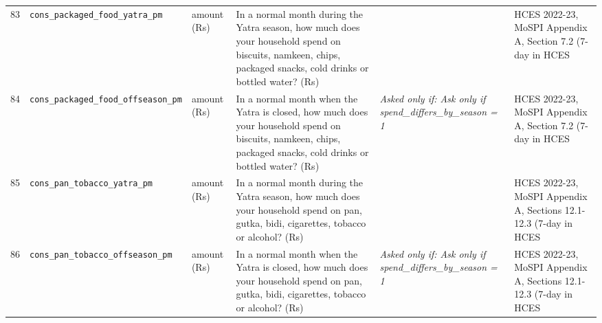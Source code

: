 \documentclass[9pt,a4paper,landscape]{article}
\begin{document}
\begin{longtable}{@{}p{0.5cm}p{3.3cm}p{1.7cm}p{7.3cm}p{5.6cm}p{5.4cm}@{}}
\footnotesize 83 & \footnotesize\texttt{cons\_packaged\_food\_yatra\_pm} & \scriptsize amount (Rs) & \footnotesize In a normal month during the Yatra season, how much does your household spend on biscuits, namkeen, chips, packaged snacks, cold drinks or bottled water? (Rs)\par\vspace{1pt}{\footnotesize\color{hdr}{\hifont यात्रा के मौसम के आम महीने में, आप (और जो यहाँ आपके साथ रहते हैं) बिस्किट, नमकीन, चिप्स, पैकेट वाले नाश्ते, कोल्ड ड्रिंक या बोतलबंद पानी पर कितना ख़र्च करते हैं? (रुपये)}} & \scriptsize  & \scriptsize HCES 2022-23, MoSPI Appendix A, Section 7.2 (7-day in HCES\\
\footnotesize 84 & \footnotesize\texttt{cons\_packaged\_food\_offseason\_pm} & \scriptsize amount (Rs) & \footnotesize In a normal month when the Yatra is closed, how much does your household spend on biscuits, namkeen, chips, packaged snacks, cold drinks or bottled water? (Rs)\par\vspace{1pt}{\footnotesize\color{hdr}{\hifont जब यात्रा बंद रहती है, उस आम महीने में आपका घर बिस्किट, नमकीन, चिप्स, पैकेट वाले नाश्ते, कोल्ड ड्रिंक या बोतलबंद पानी पर कितना ख़र्च करता है? (रुपये)}} & \scriptsize \textit{Asked only if: Ask only if spend\_differs\_by\_season = 1} & \scriptsize HCES 2022-23, MoSPI Appendix A, Section 7.2 (7-day in HCES\\
\footnotesize 85 & \footnotesize\texttt{cons\_pan\_tobacco\_yatra\_pm} & \scriptsize amount (Rs) & \footnotesize In a normal month during the Yatra season, how much does your household spend on pan, gutka, bidi, cigarettes, tobacco or alcohol? (Rs)\par\vspace{1pt}{\footnotesize\color{hdr}{\hifont यात्रा के मौसम के आम महीने में, आप (और जो यहाँ आपके साथ रहते हैं) पान, गुटका, बीड़ी, सिगरेट, तंबाकू या शराब पर कितना ख़र्च करते हैं? (रुपये)}} & \scriptsize  & \scriptsize HCES 2022-23, MoSPI Appendix A, Sections 12.1-12.3 (7-day in HCES\\
\footnotesize 86 & \footnotesize\texttt{cons\_pan\_tobacco\_offseason\_pm} & \scriptsize amount (Rs) & \footnotesize In a normal month when the Yatra is closed, how much does your household spend on pan, gutka, bidi, cigarettes, tobacco or alcohol? (Rs)\par\vspace{1pt}{\footnotesize\color{hdr}{\hifont जब यात्रा बंद रहती है, उस आम महीने में आपका घर पान, गुटका, बीड़ी, सिगरेट, तंबाकू या शराब पर कितना ख़र्च करता है? (रुपये)}} & \scriptsize \textit{Asked only if: Ask only if spend\_differs\_by\_season = 1} & \scriptsize HCES 2022-23, MoSPI Appendix A, Sections 12.1-12.3 (7-day in HCES\\

\end{longtable}
\end{document}
